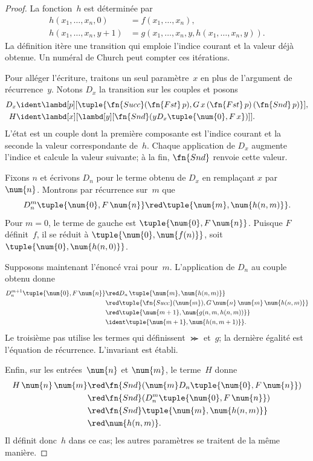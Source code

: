 \documentclass[../../../include/open-logic-section]{subfiles}
\begin{document}
\begin{proof}
La fonction~$h$ est déterminée par
\begin{align*}
  h(x_1,\dots,x_n,0)
    &=f(x_1,\dots,x_n),\\
  h(x_1,\dots,x_n,y+1)
    &=g(x_1,\dots,x_n,y,
        h(x_1,\dots,x_n,y)).
\end{align*}
La définition itère une transition
qui emploie l'indice courant et la
valeur déjà obtenue. Un numéral de
Church peut compter ces itérations.

Pour alléger l'écriture, traitons
un seul paramètre~$x$ en plus de
l'argument de récurrence~$y$.
Notons $D_x$ la transition sur les
couples et posons
\begin{align*}
  D_x &\ident
    \lambd[p][\tuple{
      \fn{Succ}(\fn{Fst}\,p),
      G\,x\,(\fn{Fst}\,p)\,(\fn{Snd}\,p)}],\\
  H &\ident
    \lambd[x][\lambd[y][
      \fn{Snd}(y D_x
      \tuple{\num{0},F\,x})]].
\end{align*}
L'état est un couple dont la première
composante est l'indice courant et la
seconde la valeur correspondante de~$h$.
Chaque application de $D_x$ augmente
l'indice et calcule la valeur suivante;
à la fin, $\fn{Snd}$ renvoie cette valeur.

Fixons $n$ et écrivons $D_n$ pour le
terme obtenu de $D_x$ en remplaçant
$x$ par~$\num{n}$. Montrons par
récurrence sur~$m$ que
\[
  D_n^m\tuple{\num{0},F\,\num{n}}
  \red\tuple{\num{m},\num{h(n,m)}}.
\]
Pour $m=0$, le terme de gauche est
$\tuple{\num{0},F\,\num{n}}$.
Puisque $F$ définit~$f$, il se réduit
à $\tuple{\num{0},\num{f(n)}}$,
soit $\tuple{\num{0},\num{h(n,0)}}$.

Supposons maintenant l'énoncé vrai
pour~$m$. L'application de $D_n$
au couple obtenu donne
\begin{align*}
  D_n^{m+1}\tuple{\num{0},F\,\num{n}}
    &\red D_n\,
      \tuple{\num{m},\num{h(n,m)}}\\
    &\red
      \tuple{\fn{Succ}(\num{m}),
        G\,\num{n}\,\num{m}\,
          \num{h(n,m)}}\\
    &\red
      \tuple{\num{m+1},
        \num{g(n,m,h(n,m))}}\\
    &\ident
      \tuple{\num{m+1},
        \num{h(n,m+1)}}.
\end{align*}
Le troisième pas utilise les termes
qui définissent $\Succ$ et~$g$;
la dernière égalité est l'équation
de récurrence. L'invariant est établi.

Enfin, sur les entrées~$\num{n}$ et
$\num{m}$, le terme~$H$ donne
\begin{align*}
  H\,\num{n}\,\num{m}
    &\red \fn{Snd}
      (\num{m}D_n
        \tuple{\num{0},F\,\num{n}})\\
    &\red \fn{Snd}
      (D_n^m\tuple{\num{0},F\,\num{n}})\\
    &\red \fn{Snd}
      \tuple{\num{m},\num{h(n,m)}}\\
    &\red \num{h(n,m)}.
\end{align*}
Il définit donc~$h$ dans ce cas;
les autres paramètres se traitent
de la même manière.
\end{proof}
\end{document}
